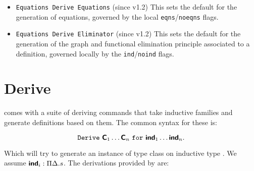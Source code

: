 \begin{itemize}
\item \texttt{Equations Derive Equations} (since v1.2) This sets the default for
  the generation of equations, governed by the local
  \texttt{eqns}/\texttt{noeqns} flags.

\item \texttt{Equations Derive Eliminator} (since v1.2) This sets the default for the
  generation of the graph and functional elimination principle
  associated to a definition, governed locally by the
  \texttt{ind}/\texttt{noind} flags.
\end{itemize}

\section{Derive}

\Equations comes with a suite of deriving commands that take inductive
families and generate definitions based on them. The common syntax for
these is:

\[\mathtt{Derive}~\textbf{\mbox{\textsf{C}}}_1 \ldots \textbf{\mbox{\textsf{C}}}_n~\mathtt{for}~\textbf{\mbox{\textsf{ind}}}_1 \ldots \textbf{\mbox{\textsf{ind}}}_n.\]

Which will try to generate an instance of type class  on
inductive type . We assume $\textbf{\mbox{\textsf{ind}}}_i : \Pi \Delta. s$.
The derivations provided by \Equations are:

